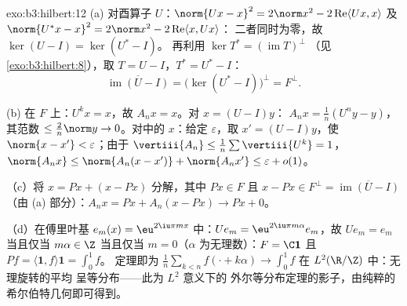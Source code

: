\begin{solution}{exo:b3:hilbert:12}
(a) 对酉算子 $U$：$\norm{Ux - x}^2 = 2\norm x^2 -
2\operatorname{Re}\langle Ux, x\rangle$ 及 $\norm{U^*x -
x}^2 = 2\norm x^2 - 2\operatorname{Re}\langle x, Ux\rangle$：
二者同时为零，故 $\ker(U - I) = \ker(U^* - I)$。
再利用 $\ker T^* = (\operatorname{im}T)^\perp$
（见\cref{exo:b3:hilbert:8}），取 $T = U - I$，$T^* = U^* -
I$：
\[
\overline{\operatorname{im}(U - I)} = \bigl(\ker(U^* -
I)\bigr)^\perp = F^\perp .
\]

(b) 在 $F$ 上：$U^kx = x$，故 $A_nx = x$。对 $x = (U - I)y$：
$A_nx = \frac1n(U^ny - y)$，其范数 $\leq \frac2n\norm y \to
0$。对中的 $x$：给定 $\varepsilon$，取 $x' =
(U - I)y$，使 $\norm{x - x'} < \varepsilon$；由于
$\vertiii{A_n} \leq \frac1n\sum\vertiii{U^k} = 1$，
$\norm{A_nx} \leq \norm{A_n(x - x')} + \norm{A_nx'} \leq
\varepsilon + o(1)$。

（c）将 $x = Px + (x - Px)$ 分解，其中 $Px \in F$ 且 $x -
Px \in F^\perp = \overline{\operatorname{im}(U - I)}$（由
(a) 部分）：$A_nx = Px + A_n(x - Px) \to Px + 0$。

（d）在傅里叶基 $e_m(x) = \eu^{2\iu\pi mx}$ 中：$Ue_m
= \eu^{2\iu\pi m\alpha}e_m$，故 $Ue_m = e_m$ 当且仅当 $m\alpha
\in \Z$ 当且仅当 $m = 0$（$\alpha$ 为无理数）：$F = \C\mathbf 1$
且 $Pf = \langle\mathbf 1, f\rangle\mathbf 1 = \int_0^1f$。
定理即为 $\frac1n\sum_{k<n}f(\cdot + k\alpha) \to
\int_0^1f$ 在 $L^2(\R/\Z)$ 中：无理旋转的平均
呈等分布——此为 $L^2$ 意义下的
外尔等分布定理的影子，由纯粹的
希尔伯特几何即可得到。
\end{solution}

